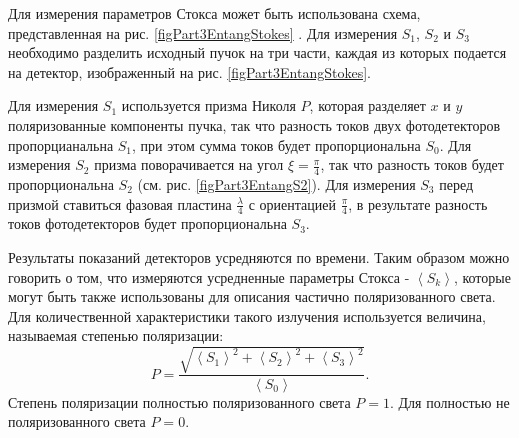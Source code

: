 

Для измерения параметров Стокса может быть использована схема,
представленная на рис. \ref{figPart3EntangStokes}
\cite{bEntangKlyshko}. Для измерения $S_1$, $S_2$ и $S_3$ необходимо
разделить исходный пучок на три части, каждая из которых подается на
детектор, изображенный на рис. \ref{figPart3EntangStokes}.



Для измерения $S_1$ используется призма Николя $P$, которая разделяет 
$x$ и $y$ поляризованные компоненты пучка,
так что разность токов двух фотодетекторов пропорцианальна $S_1$, при
этом сумма токов будет пропорциональна $S_0$. 
Для измерения $S_2$ призма поворачивается на угол $\xi =
\frac{\pi}{4}$, так что разность токов будет пропорциональна $S_2$
(см. рис. \ref{figPart3EntangS2}). 
Для измерения $S_3$ перед призмой ставиться фазовая пластина
$\frac{\lambda}{4}$ с ориентацией $\frac{\pi}{4}$, в результате
разность токов фотодетекторов будет пропорциональна $S_3$.

Результаты показаний детекторов усредняются по времени. Таким образом можно
говорить о том, что измеряются усредненные параметры Стокса - 
$\left<S_k\right>$, которые могут быть также использованы для описания
частично поляризованного света. Для количественной характеристики
такого излучения используется величина, называемая
степенью поляризации:
\begin{equation}
P = \frac{\sqrt{\left<S_1\right>^2 + \left<S_2\right>^2 +
    \left<S_3\right>^2}}{\left<S_0\right>}.
\label{eqEntangPolyarDegree}
\nonumber
\end{equation}
Степень поляризации полностью поляризованного света $P = 1$. Для  полностью не
поляризованного света $P = 0$.
